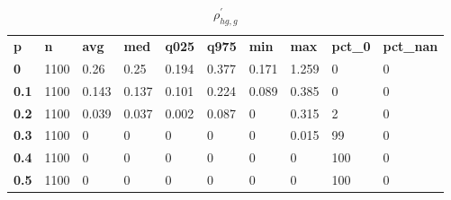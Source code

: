 \begin{table}[h]
 \centering 
\footnotesize
\caption{$\rho_{hg,g}^\prime $}
\label{tab:alphahgg}
\begin{tabular}[h]{| l l l l l l l l l l|
    } \hline
\textbf{ p} & \textbf{ n} & \textbf{ avg} & \textbf{ med} & \textbf{ q025} & \textbf{ q975} & \textbf{ min} & \textbf{ max} & \textbf{ pct\_0} & \textbf{ pct\_nan}
           \\
  \textbf{  0} & 1100 &  0.26 &  0.25 & 0.194 & 0.377 & 0.171 & 1.259 &   0 & 0
           \\
  \textbf{0.1} & 1100 & 0.143 & 0.137 & 0.101 & 0.224 & 0.089 & 0.385 &   0 & 0
           \\
  \textbf{0.2} & 1100 & 0.039 & 0.037 & 0.002 & 0.087 &     0 & 0.315 &   2 & 0
           \\
  \textbf{0.3} & 1100 &     0 &     0 &     0 &     0 &     0 & 0.015 &  99 & 0
           \\
  \textbf{0.4} & 1100 &     0 &     0 &     0 &     0 &     0 &     0 & 100 & 0
           \\
  \textbf{0.5} & 1100 &     0 &     0 &     0 &     0 &     0 &     0 & 100 & 0
           \\
 \hline \end{tabular}
 \end{table}
